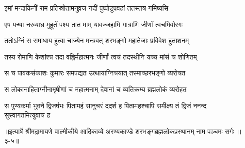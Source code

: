 \twolineshloka
{इमां मन्दाकिनीं राम प्रतिस्रोतामनुव्रज}
{नदीं पुष्पोडुपवहां ततस्तत्र गमिष्यसि} %

\twolineshloka
{एष पन्था नरव्याघ्र मुहूर्तं पश्य तात माम्}
{यावज्जहामि गात्राणि जीर्णां त्वचमिवोरगः} %

\twolineshloka
{ततोऽग्निं स समाधाय हुत्वा चाज्येन मन्त्रवत्}
{शरभङ्गो महातेजाः प्रविवेश हुताशनम्} %

\twolineshloka
{तस्य रोमाणि केशांश्च तदा वह्निर्महात्मनः}
{जीर्णां त्वचं तदस्थीनि यच्च मांसं च शोणितम्} %

\twolineshloka
{स च पावकसंकाशः कुमारः समपद्यत}
{उत्थायाग्निचयात् तस्माच्छरभङ्गो व्यरोचत} %

\twolineshloka
{स लोकानाहिताग्नीनामृषीणां च महात्मनाम्}
{देवानां च व्यतिक्रम्य ब्रह्मलोकं व्यरोहत} %

\twolineshloka
{स पुण्यकर्मा भुवने द्विजर्षभः पितामहं सानुचरं ददर्श ह}
{पितामहश्चापि समीक्ष्य तं द्विजं ननन्द सुस्वागतमित्युवाच ह} %


॥इत्यार्षे श्रीमद्रामायणे वाल्मीकीये आदिकाव्ये अरण्यकाण्डे शरभङ्गब्रह्मलोकप्रस्थानम् नाम पञ्चमः सर्गः ॥३-५॥
